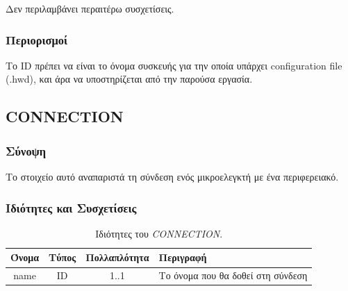 \noindent Δεν περιλαμβάνει περαιτέρω συσχετίσεις.

\subsubsection*{Περιορισμοί}

\noindent Το ID πρέπει να είναι το όνομα συσκευής για την οποία υπάρχει configuration file (.hwd), και άρα να υποστηρίζεται από την παρούσα εργασία.

\subsection{CONNECTION}
\label{subsec:connection}

\subsubsection*{Σύνοψη}

\noindent Το στοιχείο αυτό αναπαριστά τη σύνδεση ενός μικροελεγκτή με ένα περιφερειακό.

\subsubsection*{Ιδιότητες και Συσχετίσεις}

\begin{table}[H]
	\begin{center}
		\caption{Ιδιότητες του \textit{CONNECTION}.}
		\label{tab:connection1}
		\begin{tabular}{ | c | c | c| m{5.5cm} | }
			\hline
			\rowcolor{Gray}
			Όνομα & Τύπος & Πολλαπλότητα & Περιγραφή \\
			\hline
			name & ID & 1..1 &  Το όνομα που θα δοθεί στη σύνδεση \\
			\hline
		\end{tabular}
	\end{center}
\end{table}

